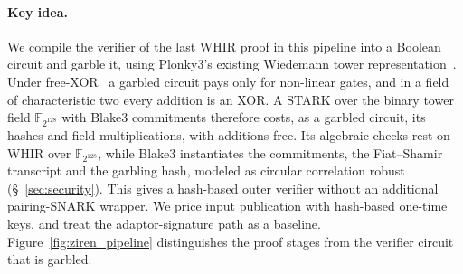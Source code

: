 \documentclass[11pt]{article}
\newcommand{\F}{\mathbb{F}_{2^{128}}}
\newcommand{\XOR}{\textsf{XOR}}
\begin{document}
\paragraph{Key idea.} We compile the verifier of the last WHIR proof in this
pipeline into a Boolean circuit and garble it, using Plonky3's
existing Wiedemann tower representation~\cite{plonky3,wiedemann88}.
Under free-XOR~\cite{ks08} a garbled circuit pays
only for non-linear gates, and in a field of characteristic two every addition
is an \XOR. A STARK over the binary tower field $\F$ with Blake3 commitments
therefore costs, as a garbled circuit, its hashes and field multiplications,
with additions free. Its algebraic checks rest on WHIR over $\F$, while Blake3
instantiates the commitments, the Fiat--Shamir transcript and the garbling hash,
modeled as circular correlation robust (\S~\ref{sec:security}). This gives a
hash-based outer verifier without an additional pairing-SNARK wrapper.
We price input publication with hash-based one-time keys, and treat the
adaptor-signature path as a baseline. Figure~\ref{fig:ziren_pipeline} distinguishes
the proof stages from the verifier circuit that is garbled.
\end{document}
